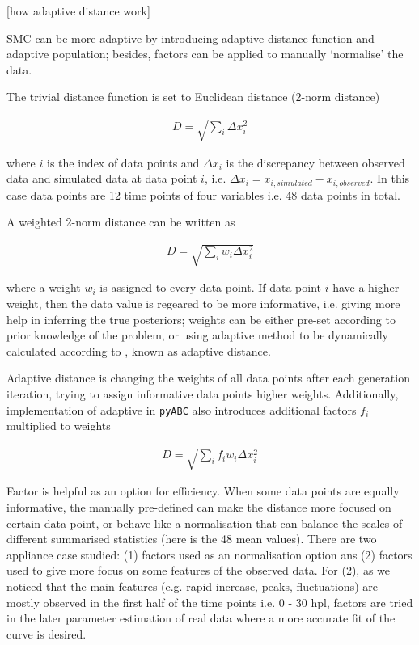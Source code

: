 \documentclass[12pt,a4paper]{report}
\begin{document}
[how adaptive distance work]

SMC can be more adaptive by introducing adaptive distance function and adaptive population; besides, factors can be applied to manually `normalise' the data.

The trivial distance function is set to Euclidean distance (2-norm distance)

\begin{align}
    \label{eq:dis}
    D=\sqrt{\sum_i \Delta x_i^2}
\end{align}

where $i$ is the index of data points and $\Delta x_i$ is the discrepancy between  observed data and simulated data at data point $i$, i.e. $\Delta x_i = x_{i, simulated}-x_{i, observed}$. In this case data points are 12 time points of four variables i.e. 48 data points in total.

A weighted 2-norm distance can be written as 

\begin{align}
    \label{dis_w}
    D=\sqrt{\sum_i w_i \Delta x_i^2}
\end{align}

where a weight $w_i$ is assigned to every data point. If data point $i$ have a higher weight, then the data value is regeared to be more informative, i.e. giving more help in inferring the true posteriors; weights can be either pre-set according to prior knowledge of the problem, or using adaptive method to be dynamically calculated according to , known as adaptive distance. 

Adaptive distance is changing the weights of all data points after each generation iteration, trying to assign informative data points higher weights. Additionally, implementation of adaptive in \verb|pyABC| also introduces additional factors $f_i$ multiplied to weights \cite{ref:adpt_dis} 

\begin{align}
    \label{dis_f}
    D=\sqrt{\sum_i f_iw_i \Delta x_i^2}
\end{align}

Factor is helpful as an option for efficiency. When some data points are equally informative, the manually pre-defined can make the distance more focused on certain data point, or behave like a normalisation that can balance the scales of different summarised statistics (here is the 48 mean values). There are two appliance case studied: (1) factors used as an normalisation option ans (2) factors used to give more focus on some features of the observed data. For (2), as we noticed that the main features (e.g. rapid increase, peaks, fluctuations) are mostly observed in the first half of the time points i.e. 0 - 30 hpl, factors are tried in the later parameter estimation of real data where a more accurate fit of the curve is desired.
\end{document}
